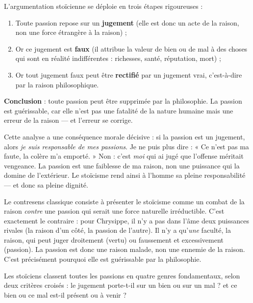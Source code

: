 \documentclass[11pt]{article}
\newcounter{popsec}
\newcounter{popsub}
\newcommand{\courssub}[1]{%
  \stepcounter{popsub}%
  \par\vspace{9pt}\noindent{\popxbold\fontsize{11.5}{13}\selectfont\color{popink}{\color{poporange}\thepopsec.\thepopsub}\hspace{6pt}#1}\par\nopagebreak\vspace{4pt}
}
\begin{document}
\begin{propriete}
L'argumentation stoïcienne se déploie en trois étapes rigoureuses :
\begin{enumerate}
\item Toute passion repose sur un \textbf{jugement} (elle est donc un acte de la raison, non une force étrangère à la raison) ;
\item Or ce jugement est \textbf{faux} (il attribue la valeur de bien ou de mal à des choses qui sont en réalité indifférentes : richesses, santé, réputation, mort) ;
\item Or tout jugement faux peut être \textbf{rectifié} par un jugement vrai, c'est-à-dire par la raison philosophique.
\end{enumerate}
\textbf{Conclusion} : toute passion peut être supprimée par la philosophie. La passion est guérissable, car elle n'est pas une fatalité de la nature humaine mais une erreur de la raison — et l'erreur se corrige.
\end{propriete}

Cette analyse a une conséquence morale décisive : si la passion est un jugement, alors \emph{je suis responsable de mes passions}. Je ne puis plus dire : « Ce n'est pas ma faute, la colère m'a emporté. » Non : c'est \emph{moi} qui ai jugé que l'offense méritait vengeance. La passion est une faiblesse de ma raison, non une puissance qui la domine de l'extérieur. Le stoïcisme rend ainsi à l'homme sa pleine responsabilité — et donc sa pleine dignité.

\begin{attention}
Le contresens classique consiste à présenter le stoïcisme comme un combat de la raison \emph{contre} une passion qui serait une force naturelle irréductible. C'est exactement le contraire : pour Chrysippe, il n'y a pas dans l'âme deux puissances rivales (la raison d'un côté, la passion de l'autre). Il n'y a qu'\emph{une} faculté, la raison, qui peut juger droitement (vertu) ou faussement et excessivement (passion). La passion est donc une raison malade, non une ennemie de la raison. C'est précisément pourquoi elle est guérissable par la philosophie.
\end{attention}

\courssub{Les quatre passions fondamentales}

Les stoïciens classent toutes les passions en quatre genres fondamentaux, selon deux critères croisés : le jugement porte-t-il sur un bien ou sur un mal ? et ce bien ou ce mal est-il présent ou à venir ?
\end{document}
